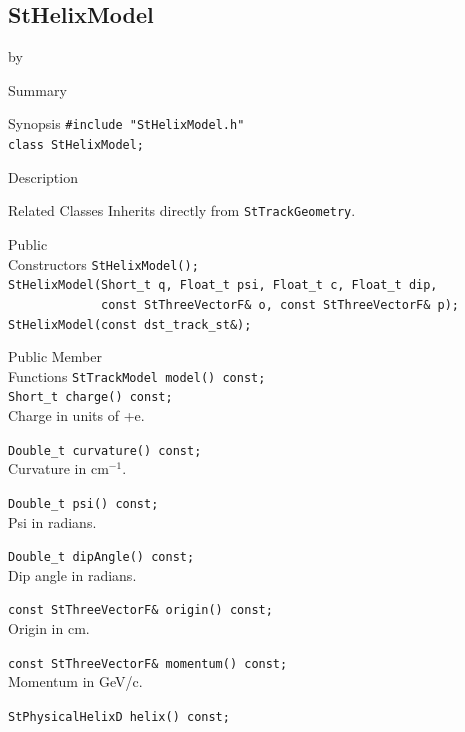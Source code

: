 \documentclass[twoside]{article}
\newcommand{\entrylabel}[1]{\mbox{\textbf{{#1}}}\hfil}%
\newenvironment{entry}
{\begin{list}{}%
    {\renewcommand{\makelabel}{\entrylabel}%
     \setlength{\labelwidth}{90pt}%
     \setlength{\leftmargin}{\labelwidth}
     \advance\leftmargin by \labelsep%
      }%
    }%
  {\end{list}}
\newcommand{\Entrylabel}[1]%
{\raisebox{0pt}[1ex][0pt]{\makebox[\labelwidth][l]%
    {\parbox[t]{\labelwidth}{\hspace{0pt}\textbf{{#1}}}}}}
\newenvironment{Entry}%
{\renewcommand{\entrylabel}{\Entrylabel}\begin{entry}}%
  {\end{entry}}
\begin{document}
\subsection{StHelixModel}
\label{sec:StHelixModel}
\begin{Entry}
\item[Summary]
\item[Synopsis]
    \verb+#include "StHelixModel.h"+\\
    \verb+class StHelixModel;+\\
\item[Description]
\item[Related Classes]
    Inherits directly from \texttt{StTrackGeometry}.
    
\item[Public\\ Constructors]
    \verb+StHelixModel();+\\
    
    \verb+StHelixModel(Short_t q, Float_t psi, Float_t c, Float_t dip,+\\
    \verb+             const StThreeVectorF& o, const StThreeVectorF& p);+\\
    
    \verb+StHelixModel(const dst_track_st&);+\\
    
\item[Public Member\\ Functions]
    \verb+StTrackModel model() const;+\\

    \verb+Short_t charge() const;+\\
    Charge in units of +e.
    
    \verb+Double_t curvature() const;+\\
    Curvature in cm$^{-1}$.

    \verb+Double_t psi() const;+\\
    Psi in radians.
    
    \verb+Double_t dipAngle() const;+\\
    Dip angle in radians.
    
    \verb+const StThreeVectorF& origin() const;+\\
    Origin in cm.
    
    \verb+const StThreeVectorF& momentum() const;+\\
    Momentum in GeV/c.
    
    \verb+StPhysicalHelixD helix() const;+\\
\end{Entry}
\clearpage
\end{document}

